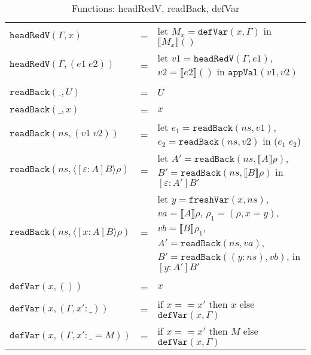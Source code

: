 \documentclass{article}
\theoremstyle{remark}
\begin{document}
\begin{table}[h]
  \centering
  \begin{tabular}{l l p{8cm}}
    $\texttt{headRedV}(\Gamma, x)$ & = & let $M_x = \texttt{defVar}(x, \Gamma)$ in $\llbracket M_x \rrbracket ()$ \\
    $\texttt{headRedV}(\Gamma, (e1 \; e2))$ & = & let $v1 = \texttt{headRedV}(\Gamma, e1)$, $v2 = \llbracket e2 \rrbracket ()$ \newline in $\texttt{appVal}(v1, v2)$ \\
    \\
    $\texttt{readBack}(\_, U)$ & = & $U$ \\
    $\texttt{readBack}(\_, x)$ & = & $x$ \\
    $\texttt{readBack}(ns, (v1 \; v2))$ & = & let $e_1 = \texttt{readBack}(ns, v1)$, $e_2 = \texttt{readBack}(ns, v2)$ \newline in ($e_1 \; e_2$) \\
    $\texttt{readBack}(ns, \langle [\varepsilon : A] B \rangle \rho)$ & = & let $A' = \texttt{readBack}(ns, \llbracket A \rrbracket \rho)$, \newline $B' = \texttt{readBack}(ns, \llbracket B \rrbracket \rho)$ \newline in $[\varepsilon : A'] B'$ \\
    $\texttt{readBack}(ns, \langle [x : A] B \rangle \rho)$ & = &  let $y = \texttt{freshVar}(x, ns)$, \newline $va = \llbracket A \rrbracket \rho$, \newline $\rho_1 = (\rho, x = y)$, \newline $vb = \llbracket B \rrbracket \rho_1$, \newline $A' = \texttt{readBack}(ns, va)$, \newline $B' = \texttt{readBack}((y : ns), vb)$, \newline in $[y : A'] B'$ \\
    \\
    $\texttt{defVar}(x, ())$ & = & $x$ \\
    $\texttt{defVar}(x, (\Gamma, x' : \_))$ & = & if $x == x'$ then $x$ else $\texttt{defVar}(x, \Gamma)$ \\
    $\texttt{defVar}(x, (\Gamma, x' : \_ = M))$ & = & if $x == x'$ then $M$ else $\texttt{defVar}(x, \Gamma)$
  \end{tabular}
  \caption{Functions: headRedV, readBack, defVar}
  \label{tab:func-primitive}
\end{table}
\end{document}
